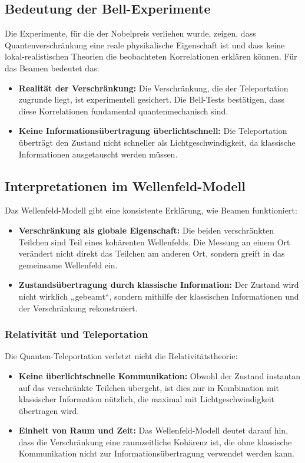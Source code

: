 \documentclass[12pt,a4paper]{article}
\begin{document}
	\subsection{Bedeutung der Bell-Experimente}
	Die Experimente, für die der Nobelpreis verliehen wurde, zeigen, dass Quantenverschränkung eine reale physikalische Eigenschaft ist und dass keine lokal-realistischen Theorien die beobachteten Korrelationen erklären können. Für das Beamen bedeutet das:
	\begin{itemize}
		\item \textbf{Realität der Verschränkung:} Die Verschränkung, die der Teleportation zugrunde liegt, ist experimentell gesichert. Die Bell-Tests bestätigen, dass diese Korrelationen fundamental quantenmechanisch sind.
		\item \textbf{Keine Informationsübertragung überlichtschnell:} Die Teleportation überträgt den Zustand nicht schneller als Lichtgeschwindigkeit, da klassische Informationen ausgetauscht werden müssen.
	\end{itemize}
	
	\subsection{Interpretationen im Wellenfeld-Modell}
	Das Wellenfeld-Modell gibt eine konsistente Erklärung, wie Beamen funktioniert:
	\begin{itemize}
		\item \textbf{Verschränkung als globale Eigenschaft:} Die beiden verschränkten Teilchen sind Teil eines kohärenten Wellenfelds. Die Messung an einem Ort verändert nicht direkt das Teilchen am anderen Ort, sondern greift in das gemeinsame Wellenfeld ein.
		\item \textbf{Zustandsübertragung durch klassische Information:} Der Zustand wird nicht wirklich „gebeamt“, sondern mithilfe der klassischen Informationen und der Verschränkung rekonstruiert.
	\end{itemize}
	
	\subsubsection{Relativität und Teleportation}
	Die Quanten-Teleportation verletzt nicht die Relativitätstheorie:
	\begin{itemize}
		\item \textbf{Keine überlichtschnelle Kommunikation:} Obwohl der Zustand instantan auf das verschränkte Teilchen übergeht, ist dies nur in Kombination mit klassischer Information nützlich, die maximal mit Lichtgeschwindigkeit übertragen wird.
		\item \textbf{Einheit von Raum und Zeit:} Das Wellenfeld-Modell deutet darauf hin, dass die Verschränkung eine raumzeitliche Kohärenz ist, die ohne klassische Kommunikation nicht zur Informationsübertragung verwendet werden kann.
	\end{itemize}
	
\end{document}
